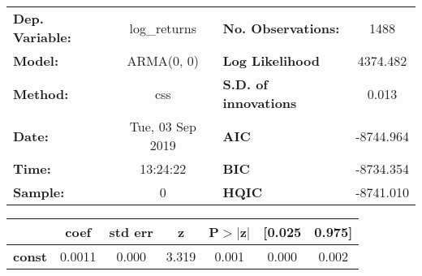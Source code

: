 \begin{center}
\begin{tabular}{lclc}
\toprule
\textbf{Dep. Variable:} &   log\_returns   & \textbf{  No. Observations:  } &    1488     \\
\textbf{Model:}         &    ARMA(0, 0)    & \textbf{  Log Likelihood     } &  4374.482   \\
\textbf{Method:}        &       css        & \textbf{  S.D. of innovations} &   0.013     \\
\textbf{Date:}          & Tue, 03 Sep 2019 & \textbf{  AIC                } & -8744.964   \\
\textbf{Time:}          &     13:24:22     & \textbf{  BIC                } & -8734.354   \\
\textbf{Sample:}        &        0         & \textbf{  HQIC               } & -8741.010   \\
\bottomrule
\end{tabular}
\begin{tabular}{lcccccc}
               & \textbf{coef} & \textbf{std err} & \textbf{z} & \textbf{P$> |$z$|$} & \textbf{[0.025} & \textbf{0.975]}  \\
\midrule
\textbf{const} &       0.0011  &        0.000     &     3.319  &         0.001        &        0.000    &        0.002     \\
\bottomrule
\end{tabular}
\end{center}
